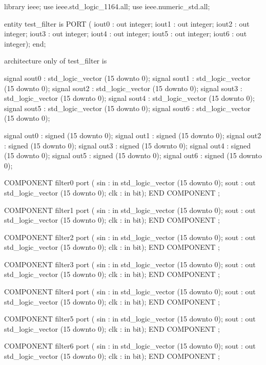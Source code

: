 \documentclass[a4paper,12pt]{report}
\begin{document}
\begin{vhdlcode}
library ieee;
use ieee.std_logic_1164.all;
use ieee.numeric_std.all;

  

entity test_filter is
    PORT (
             iout0 : out integer;
            iout1 : out integer;
            iout2 : out integer;
            iout3 : out integer;
            iout4 : out integer;
            iout5 : out integer;
            iout6 : out integer);
end;

architecture only of test_filter is

signal sout0 : std_logic_vector (15 downto 0);
signal sout1 : std_logic_vector (15 downto 0);
signal sout2 : std_logic_vector (15 downto 0);
signal sout3 : std_logic_vector (15 downto 0);
signal sout4 : std_logic_vector (15 downto 0);
signal sout5 : std_logic_vector (15 downto 0);
signal sout6 : std_logic_vector (15 downto 0);

signal out0 : signed (15 downto 0);
signal out1 : signed (15 downto 0);
signal out2 : signed (15 downto 0);
signal out3 : signed (15 downto 0);
signal out4 : signed (15 downto 0);
signal out5 : signed (15 downto 0);
signal out6 : signed (15 downto 0);

COMPONENT filter0
    port (
        sin : in std_logic_vector (15 downto 0);
        sout : out std_logic_vector (15 downto 0);
        clk : in bit);
END COMPONENT ;

COMPONENT filter1
    port (
        sin : in std_logic_vector (15 downto 0);
        sout : out std_logic_vector (15 downto 0);
        clk : in bit);
END COMPONENT ;

COMPONENT filter2
    port (
        sin : in std_logic_vector (15 downto 0);
        sout : out std_logic_vector (15 downto 0);
        clk : in bit);
END COMPONENT ;

COMPONENT filter3
    port (
        sin : in std_logic_vector (15 downto 0);
        sout : out std_logic_vector (15 downto 0);
        clk : in bit);
END COMPONENT ;

COMPONENT filter4
    port (
        sin : in std_logic_vector (15 downto 0);
        sout : out std_logic_vector (15 downto 0);
        clk : in bit);
END COMPONENT ;

COMPONENT filter5
    port (
        sin : in std_logic_vector (15 downto 0);
        sout : out std_logic_vector (15 downto 0);
        clk : in bit);
END COMPONENT ;

COMPONENT filter6
    port (
        sin : in std_logic_vector (15 downto 0);
        sout : out std_logic_vector (15 downto 0);
        clk : in bit);
END COMPONENT ;


\end{vhdlcode}
\end{document}
